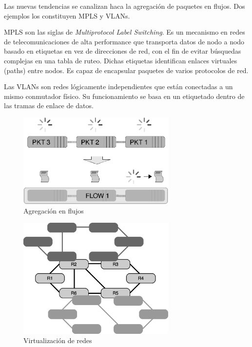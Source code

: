 Las nuevas tendencias se canalizan haca la agregación de paquetes en flujos. Dos ejemplos los constituyen MPLS y VLANs.

MPLS son las siglas de \textit{Multiprotocol Label Switching}. Es un mecanismo en redes de telecomunicaciones de alta performance que transporta datos de nodo a nodo basado en etiquetas en vez de direcciones de red, con el fin de evitar búsquedas complejas en una tabla de ruteo. Dichas etiquetas identifican enlaces virtuales (paths) entre nodos. Es capaz de encapsular paquetes de varios protocolos de red.

Las VLANs son redes lógicamente independientes que están conectadas a un mismo conmutador físico. Su funcionamiento se basa en un etiquetado dentro de las tramas de enlace de datos.



\begin{figure}[h]
  \centering
	\includegraphics[width=0.70\textwidth]{1-introduccion/graf/packet_vs_flow-crop.eps}
  \caption{Agregación en flujos}
  \label{fig:flow}
\end{figure}

\begin{figure}[h]
  \centering
	\includegraphics[width=0.70\textwidth]{1-introduccion/graf/network_virtualization_2.eps}
  \caption{Virtualización de redes}
  \label{fig:virt}
\end{figure}


